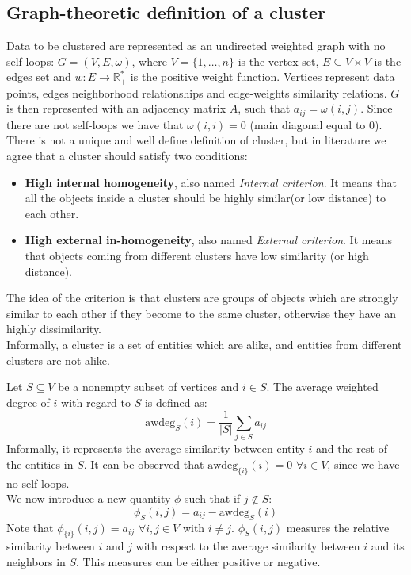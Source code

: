 \subsection{Graph-theoretic definition of a cluster}
Data to be clustered are represented as an undirected weighted graph with no self-loops: $G=(V, E, \omega)$, where $V=\{1,\dots,n\}$ is the vertex set, $E\subseteq V\times V$ is the edges set and $w: E\rightarrow \mathbb{R}^*_+$ is the positive weight function. Vertices represent data points, edges neighborhood relationships and edge-weights similarity relations. $G$ is then represented with an adjacency matrix $A$, such that $a_{ij} = \omega(i,j)$. Since there are not self-loops we have that $\omega(i,i) = 0$ (main diagonal equal to $0$).\\
There is not a unique and well define definition of cluster, but in literature we agree that a cluster should satisfy two conditions:
\begin{itemize}
  \item \textbf{High internal homogeneity}, also named \textit{Internal criterion}. It means that all the objects inside a cluster should be highly similar(or low distance) to each other.
  \item \textbf{High external in-homogeneity}, also named \textit{External criterion}. It means that objects coming from different clusters have low similarity (or high distance).
\end{itemize}
The idea of the criterion is that clusters are groups of objects which are strongly similar to each other if they become to the same cluster, otherwise they have an highly dissimilarity.\\
Informally, a cluster is a set of entities which are alike, and entities from different clusters are not alike.

Let $S\subseteq V$ be a nonempty subset of vertices and $i \in S$. The average weighted degree of $i$ with regard to $S$ is defined as:\\
\begin{equation}
  \text{awdeg}_S(i)=\frac{1}{|S|}\sum_{j\in S}a_{ij}
\end{equation}
Informally, it represents the average similarity between entity $i$ and the rest of the entities in $S$.
It can be observed that $\text{awdeg}_{\{i\}}(i) = 0$  $\forall i \in V$, since we have no self-loops.\\
We now introduce a new quantity $\phi$ such that if $j \notin S$:
\begin{equation}
  \phi_S(i, j)=a_{ij}-\text{awdeg}_S(i)
\end{equation}
Note that $\phi_{\{i\}}(i, j)=a_{ij}$ $\forall i, j\in V$ with $i \neq j$. $\phi_S(i, j)$ measures the relative similarity between $i$ and $j$ with respect to the average similarity between $i$ and its neighbors in $S$. This measures can be either positive or negative.

